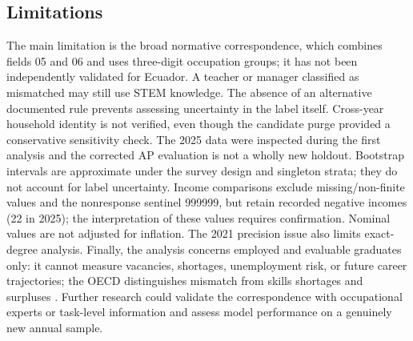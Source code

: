 \subsection{Limitations}
The main limitation is the broad normative correspondence, which combines fields 05 and 06 and uses three-digit occupation groups; it has not been independently validated for Ecuador. A teacher or manager classified as mismatched may still use STEM knowledge. The absence of an alternative documented rule prevents assessing uncertainty in the label itself. Cross-year household identity is not verified, even though the candidate purge provided a conservative sensitivity check. The 2025 data were inspected during the first analysis and the corrected AP evaluation is not a wholly new holdout. Bootstrap intervals are approximate under the survey design and singleton strata; they do not account for label uncertainty. Income comparisons exclude missing/non-finite values and the nonresponse sentinel 999999, but retain recorded negative incomes (22 in 2025); the interpretation of these values requires confirmation. Nominal values are not adjusted for inflation. The 2021 precision issue also limits exact-degree analysis. Finally, the analysis concerns employed and evaluable graduates only: it cannot measure vacancies, shortages, unemployment risk, or future career trajectories; the OECD distinguishes mismatch from skills shortages and surpluses \cite{OECD2017}. Further research could validate the correspondence with occupational experts or task-level information and assess model performance on a genuinely new annual sample.
